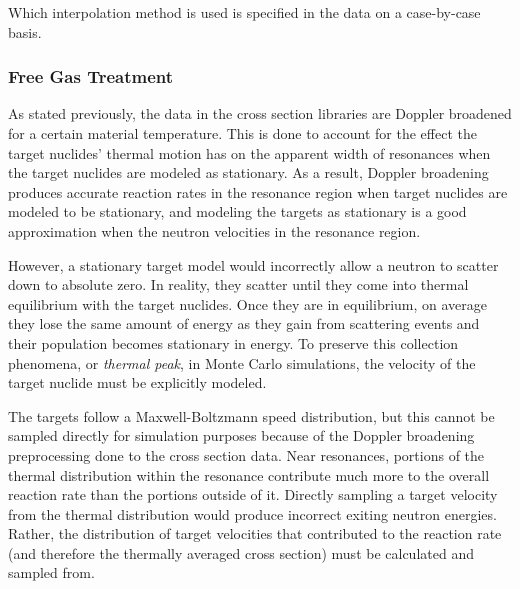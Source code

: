 Which interpolation method is used is specified in the data on a case-by-case basis. %


\subsubsection{Free Gas Treatment}

As stated previously, the data in the cross section libraries are Doppler broadened for a certain material temperature.  This is done to account for the effect the target nuclides' thermal motion has on the apparent width of resonances when the target nuclides are modeled as stationary. As a result, Doppler broadening produces accurate reaction rates in the resonance region when target nuclides are modeled to be stationary, and modeling the targets as stationary is a good approximation when the neutron velocities in the resonance region. 

However, a stationary target model would incorrectly allow a neutron to scatter down to absolute zero.  In reality, they scatter until they come into thermal equilibrium with the target nuclides.  Once they are in equilibrium, on average they lose the same amount of energy as they gain from scattering events and their population becomes stationary in energy.  To preserve this collection phenomena, or \emph{thermal peak}, in Monte Carlo simulations, the velocity of the target nuclide must be explicitly modeled.  


The targets follow a Maxwell-Boltzmann speed distribution, but this cannot be sampled directly for simulation purposes because of the Doppler broadening preprocessing done to the cross section data.  Near resonances, portions of the thermal distribution within the resonance contribute much more to the overall reaction rate than the portions outside of it.  Directly sampling a target velocity from the thermal distribution would produce incorrect exiting neutron energies.  Rather, the distribution of target velocities that contributed to the reaction rate (and therefore the thermally averaged cross section) must be calculated and sampled from.

